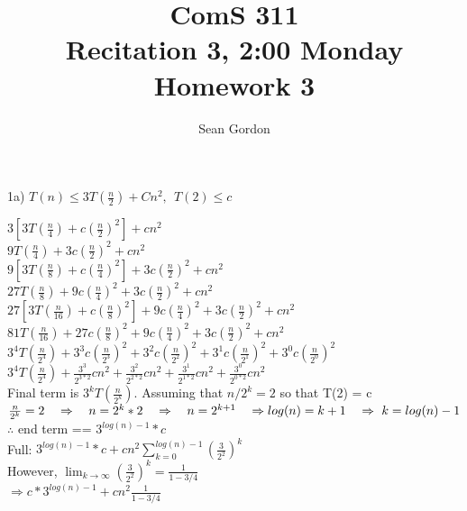 \documentclass[12pt]{article}
\title{ComS 311\\Recitation 3, 2:00 Monday\\Homework 3}
\author{Sean Gordon}
\begin{document}
\maketitle


\noindent 1a) $T(n) \le 3T(\frac{n}{2}) + Cn^2,\ \ T(2) \le c$\\

\begin{adjustwidth}{.25in}{0in}

$3[3T(\frac{n}{4})+c(\frac{n}{2})^2] + cn^2$\\
$9T(\frac{n}{4})+3c(\frac{n}{2})^2 + cn^2$\\

\noindent
$9[3T(\frac{n}{8})+c(\frac{n}{4})^2]+
3c(\frac{n}{2})^2 + cn^2$\\
\noindent
$27T(\frac{n}{8})+9c(\frac{n}{4})^2+
3c(\frac{n}{2})^2 + cn^2$\\


\noindent
$27[3T(\frac{n}{16})+c(\frac{n}{8})^2]+
9c(\frac{n}{4})^2+
3c(\frac{n}{2})^2 + cn^2$\\
\noindent
$81T(\frac{n}{16})+27c(\frac{n}{8})^2+
9c(\frac{n}{4})^2+
3c(\frac{n}{2})^2 + cn^2$\\


\noindent
$3^4T(\frac{n}{2^4}) + 
3^3c(\frac{n}{2^3})^2 + 
3^2c(\frac{n}{2^2})^2 + 
3^1c(\frac{n}{2^1})^2 + 
3^0c(\frac{n}{2^0})^2$\\
\noindent
$3^4T(\frac{n}{2^4}) + 
\frac{3^3}{2^{3*2}}cn^2 + 
\frac{3^2}{2^{2*2}}cn^2 + 
\frac{3^1}{2^{1*2}}cn^2 + 
\frac{3^0}{2^{0*2}}cn^2$\\

\noindent Final term is $3^kT(\frac{n}{2^k})$. Assuming that $n/2^k =2$ so that T(2) = c\\
$\frac{n}{2^k}=2\ \ \ \Rightarrow\ \ \ n=2^k*2\ \ \ \Rightarrow\ \ \  n=2^{k+1}\ \ \ \Rightarrow\\
log(n)=k+1\ \ \ \Rightarrow\ k=log(n)-1$\\
\indent $\therefore$ end term == $3^{log(n)-1}*c$\\

\noindent Full: $3^{log(n)-1}*c + cn^2\sum_{k=0}^{log(n)-1} (\frac{3}{2^{2}})^k$\\
However, $\lim_{k\to\infty}  (\frac{3}{2^{2}})^k = \frac{1}{1-3/4}$\\
\noindent $\Rightarrow c*3^{log(n)-1}+cn^2 \frac{1}{1-3/4}$

\end{adjustwidth}


\pagebreak
\end{document}
